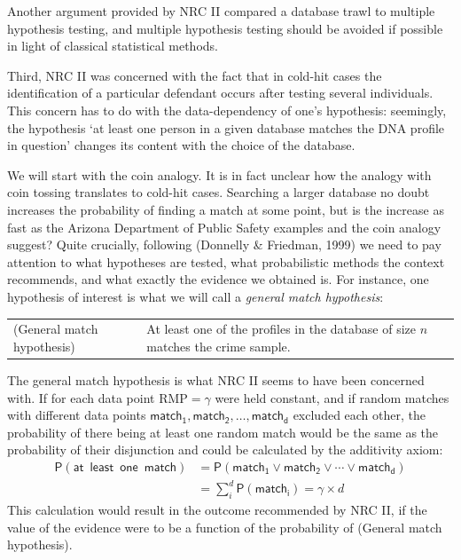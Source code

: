 \documentclass[
  10pt,
  dvipsnames,enabledeprecatedfontcommands]{scrartcl}
\newcommand{\pr}[1]{\mathsf{P}(#1)}
\begin{document}
Another argument provided by NRC II compared a database trawl to
multiple hypothesis testing, and multiple hypothesis testing should be
avoided if possible in light of classical statistical methods.

Third, NRC II was concerned with the fact that in cold-hit cases the
identification of a particular defendant occurs after testing several
individuals. This concern has to do with the data-dependency of one's
hypothesis: seemingly, the hypothesis `at least one person in a given
database matches the DNA profile in question' changes its content with
the choice of the database.

We will start with the coin analogy. It is in fact unclear how the
analogy with coin tossing translates to cold-hit cases. Searching a
larger database no doubt increases the probability of finding a match at
some point, but is the increase as fast as the Arizona Department of
Public Safety examples and the coin analogy suggest? Quite crucially,
following (Donnelly \& Friedman, 1999) we need to pay attention to what
hypotheses are tested, what probabilistic methods the context
recommends, and what exactly the evidence we obtained is. For instance,
one hypothesis of interest is what we will call a
\emph{general match hypothesis}: \vspace{1mm}

\begin{tabular}{lp{8cm}}
(General match hypothesis) &
At least one of the profiles in the database of size $n$ 
matches the crime sample.
\end{tabular}
\vspace{1mm}

\noindent The general match hypothesis is what NRC II seems to have been
concerned with. If for each data point RMP\(=\gamma\) were held
constant, and if random matches with different data points
\(\mathsf{match_1, match_2, \dots, match_d}\) excluded each other, the
probability of there being at least one random match would be the same
as the probability of their disjunction and could be calculated by the
additivity axiom: \begin{align*}
\pr{\mathsf{at\,\,\, least\,\,\, one\,\,\, match}} & = \pr{\mathsf{match_1} \vee \mathsf{match_2} \vee \cdots \vee \mathsf{match_d}} \\
& = \sum_{i}^d \pr{\mathsf{match_i}} = \gamma \times d
\end{align*} This calculation would result in the outcome recommended by
NRC II, if the value of the evidence were to be a function of the
probability of (General match hypothesis).
\end{document}
